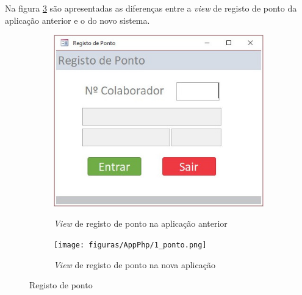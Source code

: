 \newpage
Na figura \ref{fig:comparacao_ponto} são apresentadas as diferenças entre a \textit{view} de registo de ponto da aplicação anterior e o do novo sistema.
\begin{figure}[H]
	\centering
	
	\begin{subfigure}[t]{0.3\linewidth}
		\includegraphics[width=\linewidth]{figuras/AppAccess/1-Ponto.jpg}
		\label{fig:comparacao_ponto_1}
		\caption{\textit{View} de registo de ponto na aplicação anterior}
	\end{subfigure}
	\begin{subfigure}[t]{0.60\linewidth}
		\texttt{[image: figuras/AppPhp/1\_ponto.png]}
		\label{fig:comparacao_ponto_2}
		\caption{\textit{View} de registo de ponto na nova aplicação}
	\end{subfigure}
	
	\caption{Registo de ponto}
	\label{fig:comparacao_ponto}
\end{figure}

